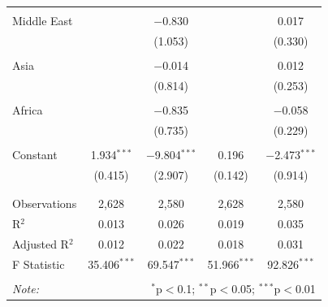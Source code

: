 \documentclass[11pt,]{article}
\begin{document}
\begin{table}[!htbp]
\begin{tabular}{@{\extracolsep{5pt}}lcccc}
  & & & & \\ 
 Middle East &  & $-$0.830 &  & 0.017 \\ 
  &  & (1.053) &  & (0.330) \\ 
  & & & & \\ 
 Asia &  & $-$0.014 &  & 0.012 \\ 
  &  & (0.814) &  & (0.253) \\ 
  & & & & \\ 
 Africa &  & $-$0.835 &  & $-$0.058 \\ 
  &  & (0.735) &  & (0.229) \\ 
  & & & & \\ 
 Constant & 1.934$^{***}$ & $-$9.804$^{***}$ & 0.196 & $-$2.473$^{***}$ \\ 
  & (0.415) & (2.907) & (0.142) & (0.914) \\ 
  & & & & \\ 
\hline \\[-1.8ex] 
Observations & 2,628 & 2,580 & 2,628 & 2,580 \\ 
R$^{2}$ & 0.013 & 0.026 & 0.019 & 0.035 \\ 
Adjusted R$^{2}$ & 0.012 & 0.022 & 0.018 & 0.031 \\ 
F Statistic & 35.406$^{***}$ & 69.547$^{***}$ & 51.966$^{***}$ & 92.826$^{***}$ \\ 
\hline 
\hline \\[-1.8ex] 
\textit{Note:}  & \multicolumn{4}{r}{$^{*}$p$<$0.1; $^{**}$p$<$0.05; $^{***}$p$<$0.01} \\ 
\end{tabular} 
\end{table}




\newpage
\singlespacing 

\end{document}

